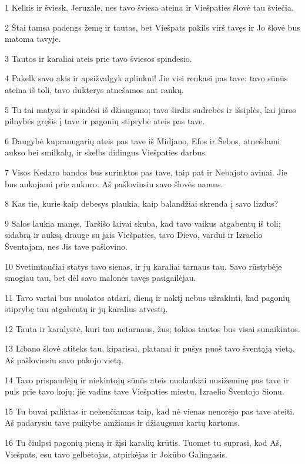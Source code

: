\par 1 Kelkis ir šviesk, Jeruzale, nes tavo šviesa ateina ir Viešpaties šlovė tau šviečia. 
\par 2 Štai tamsa padengs žemę ir tautas, bet Viešpats pakils virš tavęs ir Jo šlovė bus matoma tavyje. 
\par 3 Tautos ir karaliai ateis prie tavo šviesos spindesio. 
\par 4 Pakelk savo akis ir apsižvalgyk aplinkui! Jie visi renkasi pas tave: tavo sūnūs ateina iš toli, tavo dukterys atnešamos ant rankų. 
\par 5 Tu tai matysi ir spindėsi iš džiaugsmo; tavo širdis sudrebės ir išsiplės, kai jūros pilnybės gręšis į tave ir pagonių stiprybė ateis pas tave. 
\par 6 Daugybė kupranugarių ateis pas tave iš Midjano, Efos ir Šebos, atnešdami aukso bei smilkalų, ir skelbs didingus Viešpaties darbus. 
\par 7 Visos Kedaro bandos bus surinktos pas tave, taip pat ir Nebajoto avinai. Jie bus aukojami prie aukuro. Aš pašlovinsiu savo šlovės namus. 
\par 8 Kas tie, kurie kaip debesys plaukia, kaip balandžiai skrenda į savo lizdus? 
\par 9 Salos laukia manęs, Taršišo laivai skuba, kad tavo vaikus atgabentų iš toli; sidabrą ir auksą drauge su jais Viešpaties, tavo Dievo, vardui ir Izraelio Šventajam, nes Jis tave pašlovino. 
\par 10 Svetimtaučiai statys tavo sienas, ir jų karaliai tarnaus tau. Savo rūstybėje smogiau tau, bet dėl savo malonės tavęs pasigailėjau. 
\par 11 Tavo vartai bus nuolatos atdari, dieną ir naktį nebus užrakinti, kad pagonių stiprybę tau atgabentų ir jų karalius atvestų. 
\par 12 Tauta ir karalystė, kuri tau netarnaus, žus; tokios tautos bus visai sunaikintos. 
\par 13 Libano šlovė atiteks tau, kiparisai, platanai ir pušys puoš tavo šventąją vietą, Aš pašlovinsiu savo pakojo vietą. 
\par 14 Tavo prispaudėjų ir niekintojų sūnūs ateis nuolankiai nusižeminę pas tave ir puls prie tavo kojų; jie vadins tave Viešpaties miestu, Izraelio Šventojo Sionu. 
\par 15 Tu buvai paliktas ir nekenčiamas taip, kad nė vienas nenorėjo pas tave ateiti. Aš padarysiu tave puikybe amžiams ir džiaugsmu kartų kartoms. 
\par 16 Tu čiulpsi pagonių pieną ir žįsi karalių krūtis. Tuomet tu suprasi, kad Aš, Viešpats, esu tavo gelbėtojas, atpirkėjas ir Jokūbo Galingasis. 
